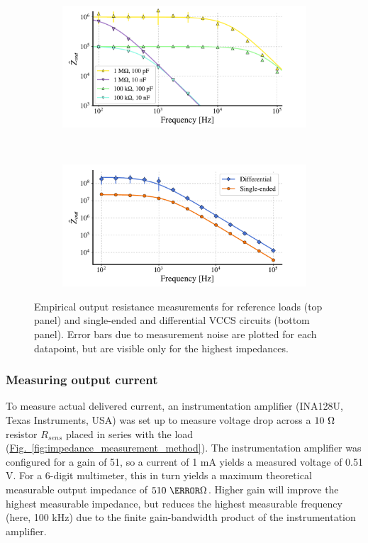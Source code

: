 \documentclass[10pt]{article}
\newcommand{\brieffiglink}[1]{\hyperref[#1]{Fig.~\ref*{#1}}}
\begin{document}
\begin{figure}[t!]
\begin{subfigure}{\textwidth}
\includegraphics[scale=.6]{../paper/output_resistance_empirical_ref.pdf}
\caption*{}
\end{subfigure}
\ \\
\begin{subfigure}{\textwidth}
\includegraphics[scale=.6]{../paper/fig_output_resistance_empirical.pdf}
\caption*{}
\end{subfigure}
\caption{\small Empirical output resistance measurements for reference loads (top panel) and single-ended and differential VCCS circuits (bottom panel). Error bars due to measurement noise are plotted for each datapoint, but are visible only for the highest impedances.}
\label{fig:output_resistance_empirical}
\end{figure}

\subsubsection{Measuring output current}

To measure actual delivered current, an instrumentation amplifier (INA128U, Texas Instruments, USA) was set up to measure voltage drop across a $10~\ohm$ resistor $R_{sens}$ placed in series with the load (\brieffiglink{fig:impedance_measurement_method}). The instrumentation amplifier was configured for a gain of 51, so a current of 1 mA yields a measured voltage of 0.51 V. For a 6-digit multimeter, this in turn yields a maximum theoretical measurable output impedance of $510~\mega\ohm$. Higher gain will improve the highest measurable impedance, but reduces the highest measurable frequency (here, 100 kHz) due to the finite gain-bandwidth product of the instrumentation amplifier.
\end{document}
